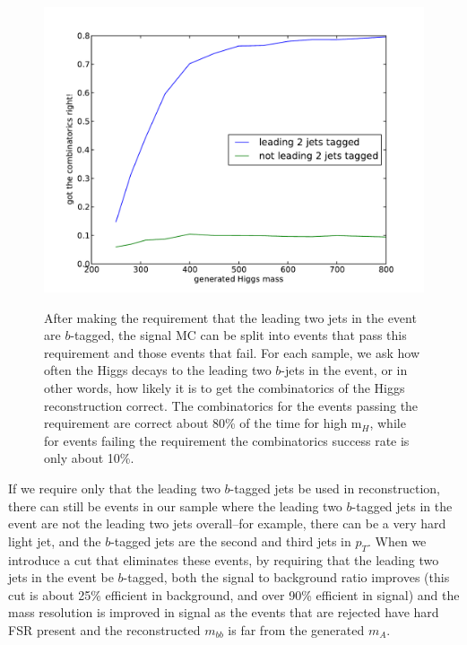 \begin{figure}
  \centering
    \includegraphics[width=0.78\linewidth]{SignalKin/combinatorics_success.pdf}
    \label{fig:combinatorics_success}
    \caption{After making the requirement that the leading two jets in the event are $b$-tagged,
    the signal MC can be split into events that pass this requirement and those events that fail.
    For each sample, we ask how often the Higgs decays to the leading two $b$-jets in the event,
    or in other words, how likely it is to get the combinatorics of the Higgs reconstruction correct.
    The combinatorics for the events passing the requirement are correct about 80\% of the time for
    high m$_H$, while for events failing the requirement the combinatorics success rate is only about 10\%.}
\end{figure}
                                                                                                                                                                 
                                                                                                                                    
If we require only that the leading two $b$-tagged jets be used in reconstruction, there can                                          
still be events in our sample where the leading two $b$-tagged jets in the event are not                                              
the leading two jets overall--for example, there can be a very hard light jet, and the $b$-tagged                                     
jets are the second and third jets in $p_T$.  When we introduce a cut that eliminates these events,                                 
by requiring that the leading two jets in the event be $b$-tagged, both the signal to background                                      
ratio improves (this cut is about 25\% efficient in background, and over 90\% efficient                                             
in signal) and the mass resolution is improved in signal as the events that are rejected have                                           
hard FSR present and the reconstructed $m_{bb}$ is far from the generated $m_A$.    

